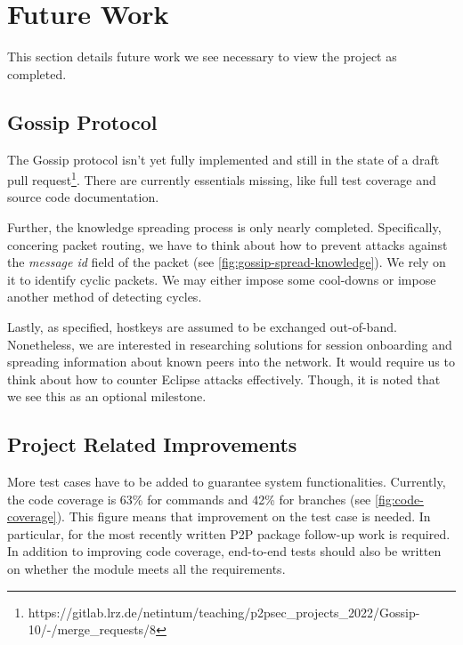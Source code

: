 \section{Future Work}\label{sec:future-work}

This section details future work we see necessary to view the project as completed.

\subsection{Gossip Protocol}\label{subsec:gossip-protocol-future-work}

The Gossip protocol isn't yet fully implemented and still in the state of a
draft pull request\footnote{https://gitlab.lrz.de/netintum/teaching/p2psec\_projects\_2022/Gossip-10/-/merge\_requests/8}.
There are currently essentials missing, like full test coverage and source code documentation.

Further, the knowledge spreading process is only nearly completed.
Specifically, concering packet routing, we have to think about how to prevent attacks against the
\textit{message id} field of the  packet (see \autoref{fig:gossip-spread-knowledge}).
We rely on it to identify cyclic packets.
We may either impose some cool-downs or impose another method of detecting cycles.

Lastly, as specified, hostkeys are assumed to be exchanged out-of-band.
Nonetheless, we are interested in researching solutions for session onboarding and spreading
information about known peers into the network.
It would require us to think about how to counter Eclipse attacks effectively.
Though, it is noted that we see this as an optional milestone.

\subsection{Project Related Improvements}\label{subsec:development-purposes-improvements}

More test cases have to be added to guarantee system functionalities. 
Currently, the code coverage is 63\% for commands and 42\% for branches (see \autoref{fig:code-coverage}).
This figure means that improvement on the test case is needed.
In particular, for the most recently written P2P package follow-up work is required.
In addition to improving code coverage, end-to-end tests should also be written on whether the module meets all the requirements.


